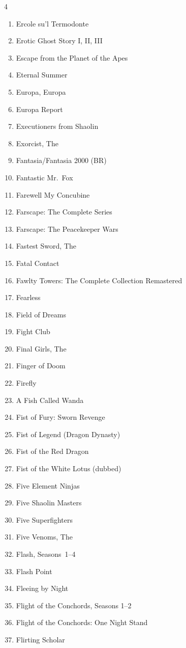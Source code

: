 \documentclass{article}
\begin{document}
\begin{multicols}{4}
\begin{enumerate}
\item Ercole su'l Termodonte
\item Erotic Ghost Story I, II, III
\item Escape from the Planet of the Apes
\item Eternal Summer
\item Europa, Europa
\item Europa Report
\item Executioners from Shaolin
\item Exorcist, The
\item Fantasia/Fantasia 2000 (BR)
\item Fantastic Mr.~Fox
\item Farewell My Concubine
\item Farscape: The Complete Series
\item Farscape: The Peacekeeper Wars
\item Fastest Sword, The
\item Fatal Contact
\item Fawlty Towers: The Complete Collection Remastered
\item Fearless
\item Field of Dreams
\item Fight Club
\item Final Girls, The
\item Finger of Doom
\item Firefly
\item A Fish Called Wanda
\item Fist of Fury: Sworn Revenge
\item Fist of Legend (Dragon Dynasty)
\item Fist of the Red Dragon
\item Fist of the White Lotus (dubbed)
\item Five Element Ninjas
\item Five Shaolin Masters
\item Five Superfighters
\item Five Venoms, The
\item Flash, Seasons~1--4
\item Flash Point
\item Fleeing by Night
\item Flight of the Conchords, Seasons 1--2
\item Flight of the Conchords: One Night Stand
\item Flirting Scholar

\end{enumerate}
\end{multicols}
\end{document}
